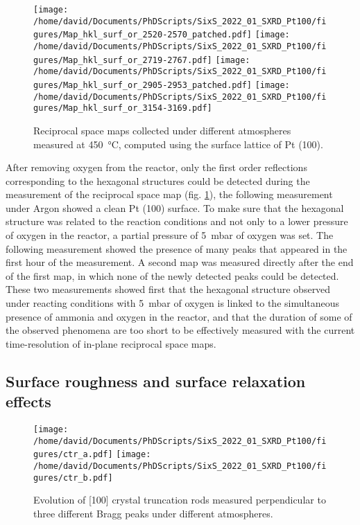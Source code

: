 \begin{figure}[!htb]
    \centering
    \texttt{[image: /home/david/Documents/PhDScripts/SixS\_2022\_01\_SXRD\_Pt100/figures/Map\_hkl\_surf\_or\_2520-2570\_patched.pdf]}
    \texttt{[image: /home/david/Documents/PhDScripts/SixS\_2022\_01\_SXRD\_Pt100/figures/Map\_hkl\_surf\_or\_2719-2767.pdf]}
    \texttt{[image: /home/david/Documents/PhDScripts/SixS\_2022\_01\_SXRD\_Pt100/figures/Map\_hkl\_surf\_or\_2905-2953\_patched.pdf]}
    \texttt{[image: /home/david/Documents/PhDScripts/SixS\_2022\_01\_SXRD\_Pt100/figures/Map\_hkl\_surf\_or\_3154-3169.pdf]}
    \caption{
        Reciprocal space maps collected under different atmospheres measured at \qty{450}{\degreeCelsius}, computed using the surface lattice of Pt (100).
    }
    \label{fig:MapsPt100C}
\end{figure}

After removing oxygen from the reactor, only the first order reflections corresponding to the hexagonal structures could be detected during the measurement of the reciprocal space map (fig. \ref{fig:MapsPt100C}), the following measurement under Argon showed a clean Pt (100) surface.
To make sure that the hexagonal structure was related to the reaction conditions and not only to a lower pressure of oxygen in the reactor, a partial pressure of \qty{5}{\milli\bar} of oxygen was set.
The following measurement showed the presence of many peaks that appeared in the first hour of the measurement.
A second map was measured directly after the end of the first map, in which none of the newly detected peaks could be detected.
These two measurements showed first that the hexagonal structure observed under reacting conditions with \qty{5}{\milli\bar} of oxygen is linked to the simultaneous presence of ammonia and oxygen in the reactor, and that the duration of some of the observed phenomena are too short to be effectively measured with the current time-resolution of in-plane reciprocal space maps.

\subsection{Surface roughness and surface relaxation effects}

\begin{figure}[!htb]
    \centering
    \texttt{[image: /home/david/Documents/PhDScripts/SixS\_2022\_01\_SXRD\_Pt100/figures/ctr\_a.pdf]}
    \texttt{[image: /home/david/Documents/PhDScripts/SixS\_2022\_01\_SXRD\_Pt100/figures/ctr\_b.pdf]}
    \caption{
        Evolution of [100] crystal truncation rods measured perpendicular to three different Bragg peaks under different atmospheres.
    }
    \label{fig:CTRPt100}
\end{figure}

